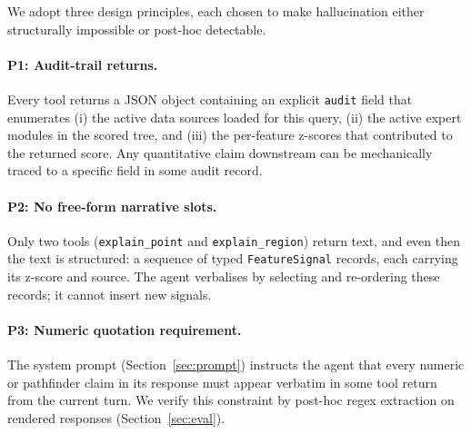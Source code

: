 \documentclass[11pt]{article}
\begin{document}

We adopt three design principles, each chosen to make hallucination
either structurally impossible or post-hoc detectable.

\paragraph{P1: Audit-trail returns.}
Every tool returns a JSON object containing an explicit
\texttt{audit} field that enumerates (i) the active data sources
loaded for this query, (ii) the active expert modules in the scored
tree, and (iii) the per-feature z-scores that contributed to the
returned score. Any quantitative claim downstream can be
mechanically traced to a specific field in some audit record.

\paragraph{P2: No free-form narrative slots.}
Only two tools (\texttt{explain\_point} and \texttt{explain\_region})
return text, and even then the text is structured: a sequence of
typed \texttt{FeatureSignal} records, each carrying its z-score and
source. The agent verbalises by selecting and re-ordering these
records; it cannot insert new signals.

\paragraph{P3: Numeric quotation requirement.}
The system prompt (Section~\ref{sec:prompt}) instructs the agent that
every numeric or pathfinder claim in its response must appear
verbatim in some tool return from the current turn. We verify this
constraint by post-hoc regex extraction on rendered responses
(Section~\ref{sec:eval}).
\end{document}
